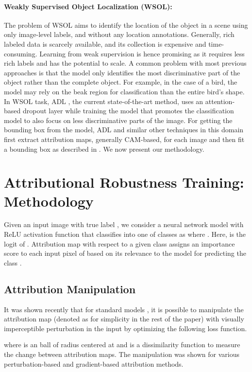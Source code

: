 \documentclass[runningheads]{llncs}
\begin{document}
\paragraph{\textbf{Weakly Supervised Object Localization (WSOL):}}
The problem of WSOL aims to identify the location of the object in a scene using only image-level labels, and without any location annotations. Generally, rich labeled data is scarcely available, and its collection is expensive and time-consuming. Learning from weak supervision is hence promising as it requires less rich labels and has the potential to scale. A common problem with most previous approaches is that the model only identifies the most discriminative part of the object rather than the complete object. For example, in the case of a bird, the model may rely on the beak region for classification than the entire bird's shape. In WSOL task, ADL \cite{adl}, the current state-of-the-art method, uses an attention-based dropout layer while training the model that promotes the classification model to also focus on less discriminative parts of the image. For getting the bounding box from the model, ADL and similar other techniques in this domain first extract attribution maps, generally CAM-based\cite{attr2016cam}, for each image and then fit a bounding box as described in \cite{attr2016cam}. We now present our methodology.


\section{Attributional Robustness Training: Methodology}
\label{sec_method}
Given an input image  with true label , we consider a neural network model  with ReLU activation function that classifies  into one of  classes as  where . Here,  is the  logit of . Attribution map  with respect to a given class  assigns an importance score to each input pixel of  based on its relevance to the model for predicting the class . 

\subsection{Attribution Manipulation}
It was shown recently \cite{nips_sal,aaai_sal} that for standard models , it is possible to manipulate the attribution map  (denoted as  for simplicity in the rest of the paper) with visually imperceptible perturbation  in the input by optimizing the following loss function.  

where  is an  ball of radius  centered at  and  is a dissimilarity function to measure the change between attribution maps. The manipulation was shown for various perturbation-based and gradient-based attribution methods. 
\end{document}
